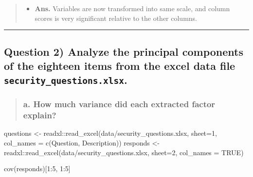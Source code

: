 \documentclass[
]{article}
\newenvironment{Shaded}{\begin{snugshade}}{\end{snugshade}}
\newcommand{\AttributeTok}[1]{\textcolor[rgb]{0.77,0.63,0.00}{#1}}
\newcommand{\ConstantTok}[1]{\textcolor[rgb]{0.00,0.00,0.00}{#1}}
\newcommand{\DecValTok}[1]{\textcolor[rgb]{0.00,0.00,0.81}{#1}}
\newcommand{\FunctionTok}[1]{\textcolor[rgb]{0.00,0.00,0.00}{#1}}
\newcommand{\NormalTok}[1]{#1}
\newcommand{\OtherTok}[1]{\textcolor[rgb]{0.56,0.35,0.01}{#1}}
\newcommand{\SpecialCharTok}[1]{\textcolor[rgb]{0.00,0.00,0.00}{#1}}
\newcommand{\StringTok}[1]{\textcolor[rgb]{0.31,0.60,0.02}{#1}}
\providecommand{\tightlist}{%
  \setlength{\itemsep}{0pt}\setlength{\parskip}{0pt}}
\begin{document}
\begin{quote}
\begin{itemize}
\tightlist
\item
  \textbf{Ans.} Variables are now transformed into same scale, and
  column scores is very significant relative to the other columns.
\end{itemize}
\end{quote}

\begin{center}\rule{0.5\linewidth}{0.5pt}\end{center}

\hypertarget{question-2-analyze-the-principal-components-of-the-eighteen-items-from-the-excel-data-file-security_questions.xlsx.}{%
\subsection{\texorpdfstring{Question 2) Analyze the principal components
of the eighteen items from the excel data file
\texttt{security\_questions.xlsx}.}{Question 2) Analyze the principal components of the eighteen items from the excel data file security\_questions.xlsx.}}\label{question-2-analyze-the-principal-components-of-the-eighteen-items-from-the-excel-data-file-security_questions.xlsx.}}

\begin{quote}
\hypertarget{a.-how-much-variance-did-each-extracted-factor-explain}{%
\subsubsection{a. How much variance did each extracted factor
explain?}\label{a.-how-much-variance-did-each-extracted-factor-explain}}
\end{quote}

\begin{Shaded}
\begin{Highlighting}[]
\NormalTok{questions }\OtherTok{\textless{}{-}}\NormalTok{ readxl}\SpecialCharTok{::}\FunctionTok{read\_excel}\NormalTok{(}\StringTok{\textquotesingle{}data/security\_questions.xlsx\textquotesingle{}}\NormalTok{,}
                                        \AttributeTok{sheet=}\DecValTok{1}\NormalTok{,}
                                        \AttributeTok{col\_names =} \FunctionTok{c}\NormalTok{(}\StringTok{\textquotesingle{}Question\textquotesingle{}}\NormalTok{, }\StringTok{\textquotesingle{}Description\textquotesingle{}}\NormalTok{))}
\NormalTok{responds }\OtherTok{\textless{}{-}}\NormalTok{ readxl}\SpecialCharTok{::}\FunctionTok{read\_excel}\NormalTok{(}\StringTok{\textquotesingle{}data/security\_questions.xlsx\textquotesingle{}}\NormalTok{,}
                              \AttributeTok{sheet=}\DecValTok{2}\NormalTok{,}
                              \AttributeTok{col\_names =} \ConstantTok{TRUE}\NormalTok{)}

\FunctionTok{cov}\NormalTok{(responds)[}\DecValTok{1}\SpecialCharTok{:}\DecValTok{5}\NormalTok{, }\DecValTok{1}\SpecialCharTok{:}\DecValTok{5}\NormalTok{]}
\end{Highlighting}
\end{Shaded}
\end{document}
